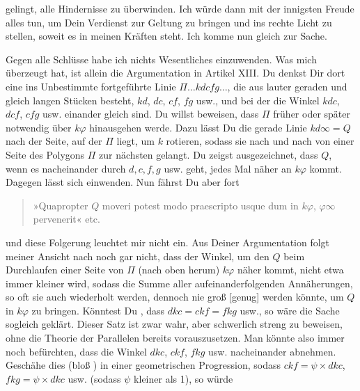 gelingt, alle Hindernisse zu überwinden. Ich würde dann mit der
innigsten Freude alles tun, um Dein Verdienst zur Geltung zu bringen und
ins rechte Licht zu stellen, soweit es in meinen Kräften steht. Ich komme nun
gleich zur Sache.

Gegen alle  Schlüsse habe ich nichts Wesentliches
einzuwenden. Was mich  
überzeugt hat, ist allein die Argumentation in Artikel XIII. Du denkst
Dir dort eine ins Unbestimmte fortgeführte Linie $\Pi\dots kdcfg\dots$,
die aus lauter geraden und gleich langen Stücken besteht, $kd$, $dc$, $cf$,
$fg$ usw., und bei der die Winkel $kdc$, $dcf$, $cfg$ usw. einander gleich
sind. Du willst beweisen, dass $\Pi$ früher oder später notwendig
über $k\varphi$ hinausgehen werde. Dazu lässt Du die
gerade Linie $kd\infty = Q$ nach der Seite, auf der $\Pi$ liegt,
um $k$ rotieren, sodass sie nach und nach von einer Seite des
Polygons $\Pi$ zur nächsten gelangt. Du zeigst ausgezeichnet, dass $Q$,
wenn es nacheinander durch $d, c, f, g$ usw. geht, jedes Mal näher
an $k\varphi$ kommt. Dagegen lässt sich
einwenden. Nun fährst Du aber fort
\begin{center}\end{center}
\begin{quote}
»Quapropter $Q$ moveri potest modo praescripto usque dum in
$k\varphi$, $\varphi\infty$ pervenerit« etc.
\end{quote}
und diese Folgerung leuchtet mir nicht ein. Aus Deiner
Argumentation folgt meiner Ansicht nach noch gar nicht, dass der
Winkel, um den $Q$ beim Durchlaufen einer Seite von $\Pi$ (nach oben
herum) $k\varphi$ näher kommt, nicht etwa immer kleiner
wird, sodass die Summe aller aufeinanderfolgenden Annäherungen, so oft
sie auch wiederholt werden, dennoch nie groß [genug]
werden könnte, um $Q$ in $k\varphi$ zu bringen. Könntest Du ,
dass $dkc = ckf = fkg$ usw., so wäre die Sache sogleich geklärt.
Dieser Satz ist zwar wahr, aber schwerlich streng zu beweisen, ohne
die Theorie der Parallelen bereits vorauszusetzen. Man könnte
also immer noch befürchten, dass die Winkel $dkc$, $ckf$, $fkg$ usw.
nacheinander abnehmen. Geschähe dies (bloß ) in einer
geometrischen Progression, sodass $ckf = \psi \times dkc$,
$fkg = \psi \times dkc$ usw. (sodass $\psi$ kleiner als 1), so würde
